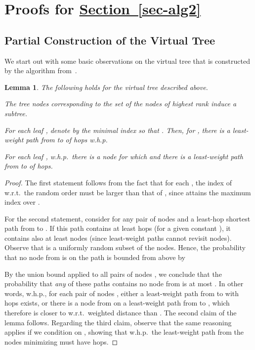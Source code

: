 \documentclass[letterpaper,11pt]{article}
\newtheorem{lemma}[theorem]{Lemma}
\newcommand{\namedref}[2]{\hyperref[#2]{#1~\ref*{#2}}}
\newcommand{\sectionref}[1]{\namedref{Section}{#1}}
\begin{document}
\section{Proofs for \texorpdfstring{\sectionref{sec-alg2}}{Section
\ref*{sec-alg2}}}

\subsection{Partial Construction of the Virtual Tree}\label{sec:partial}
We start out with some basic observations on the virtual tree that is
constructed by the algorithm from~\cite{KKMPT-12}.
\begin{lemma}\label{lemma:stage1_tree_s}
The following holds for the virtual tree described above.
\begin{compactenum}
\item The tree nodes corresponding to the set  of the  nodes
of highest rank induce a subtree.
\item For each leaf , denote by  the
minimal index so that . Then,
for , there is a least-weight path from  to  of
 hops w.h.p.
\item For each leaf , w.h.p.\ there is a node
 for which  and there is a least-weight path from  to 
of  hops.
\end{compactenum}
\end{lemma}
\begin{proof}
The first statement follows from the fact that for each ,
the index of  w.r.t.\ the random order must be larger than that of
, since  attains the maximum index over
.

For the second statement, consider for any pair of nodes  and  a
least-hop shortest path from  to . If this path contains at least
 hops (for a given constant ), it contains also at least
 nodes (since least-weight paths cannot revisit nodes).
Observe that  is a uniformly random subset of the nodes. Hence, the
probability that no node from  is on the path is bounded from above
by

By the union bound applied to all pairs of nodes , we conclude that
the probability that \emph{any} of these paths contains no node from 
is at most . In other words, w.h.p., for each pair of nodes , either a least-weight path from  to  with
 hops exists, or there is a node from  on a
least-weight path from  to , which therefore is closer to  w.r.t.\
weighted distance than . The second claim of the lemma follows. Regarding
the third claim, observe that the same reasoning applies if we condition on
, showing that w.h.p.\ the least-weight path from  the nodes
 minimizing  must have  hops.
\end{proof}
\end{document}
